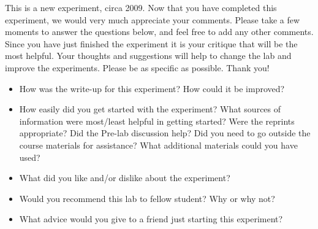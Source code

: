 \documentclass{../lab}
\begin{document}
This is a new experiment, circa 2009. Now that you have completed this experiment, we would very much appreciate your comments. Please take a few moments to answer the questions below, and feel free to add any other comments. Since you have just finished the experiment it is your critique that will be the most helpful. Your thoughts and suggestions will help to change the lab and improve the experiments. Please be as specific as possible. Thank you!

\begin{itemize}
    \item How was the write-up for this experiment? How could it be improved?

    \item How easily did you get started with the experiment? What sources of information were most/least helpful in getting started? Were the reprints appropriate? Did the Pre-lab discussion help? Did you need to go outside the course materials for assistance? What additional materials could you have used?

    \item What did you like and/or dislike about the experiment?

    \item Would you recommend this lab to fellow student? Why or why not?

    \item What advice would you give to a friend just starting this experiment?
\end{itemize}
\end{document}

